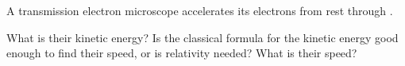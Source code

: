 A transmission electron microscope accelerates its electrons from rest through \UO.

\begin{abcliste}
\abc What is their kinetic energy?
\abc Is the classical formula for the kinetic energy good enough to find their speed, or is relativity needed?
\abc What is their speed?
\end{abcliste}
